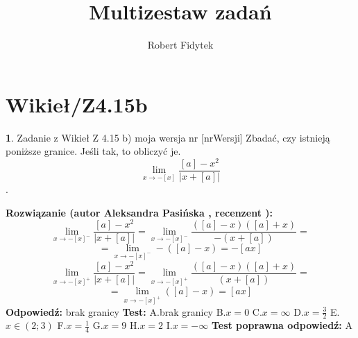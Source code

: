 \documentclass[12pt, a4paper]{article}
\title{Multizestaw zadań}
\author{Robert Fidytek}
\date{}
\theoremstyle{definition} %
\newtheorem{zad}{}
\newcommand{\kategoria}[1]{\section{#1}} %
\newcommand{\zadStart}[1]{\begin{zad}#1\newline} %
\newcommand{\zadStop}{\end{zad}}   %
\newcommand{\rozwStart}[2]{\noindent \textbf{Rozwiązanie (autor #1 , recenzent #2): }\newline} %
\newcommand{\rozwStop}{\newline}                                            %
\newcommand{\odpStart}{\noindent \textbf{Odpowiedź:}\newline}    %
\newcommand{\odpStop}{\newline}                                             %
\newcommand{\testStart}{\noindent \textbf{Test:}\newline} %
\newcommand{\testStop}{\newline} %
\newcommand{\kluczStart}{\noindent \textbf{Test poprawna odpowiedź:}\newline} %
\newcommand{\kluczStop}{\newline} %
\begin{document}
\maketitle


\kategoria{Wikieł/Z4.15b}
\zadStart{Zadanie z Wikieł Z 4.15 b) moja wersja nr [nrWersji]}
Zbadać, czy istnieją poniższe granice. Jeśli tak, to obliczyć je. $$\lim_{x\rightarrow -[x]}\frac{[a]-x^2}{|x+[a]|}$$.
\zadStop
\rozwStart{Aleksandra Pasińska}{}
$$\lim_{x\rightarrow -[x]^-}\frac{[a]-x^2}{|x+[a]|}=\lim_{x\rightarrow -[x]^-}\frac{([a]-x)([a]+x)}{-(x+[a])}=$$
$$=\lim_{x\rightarrow -[x]^-}-([a]-x)=-[ax]$$ 
$$\lim_{x\rightarrow -[x]^+}\frac{[a]-x^2}{|x+[a]|}=\lim_{x\rightarrow -[x]^+}\frac{([a]-x)([a]+x)}{(x+[a])}=$$
$$=\lim_{x\rightarrow -[x]^+}([a]-x)=[ax]$$ 
\rozwStop
\odpStart
brak granicy
\odpStop
\testStart
A.brak granicy
B.$x=0$
C.$x=\infty$
D.$x=\frac{3}{2}$
E.$x\in (2;3)$
F.$x=\frac{1}{4}$
G.$x=9$
H.$x=2$
I.$x=-\infty$
\testStop
\kluczStart
A
\kluczStop
\end{document}
